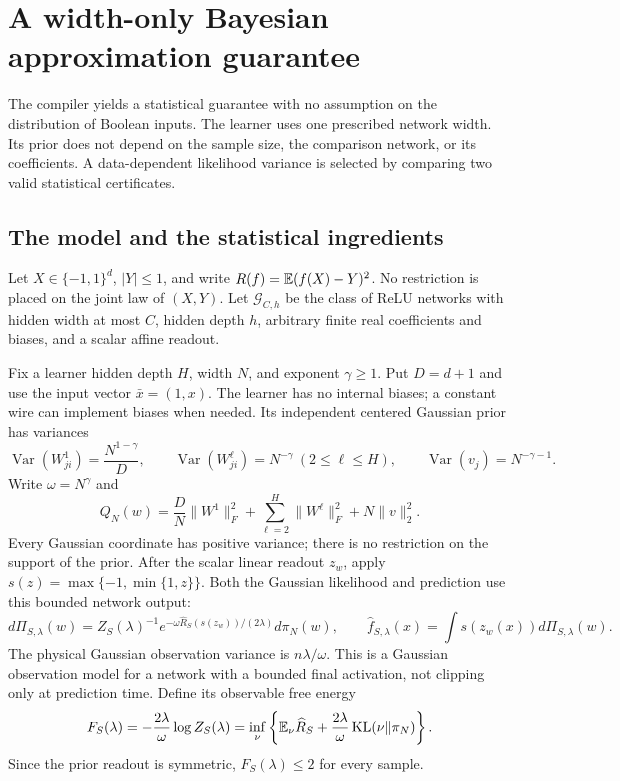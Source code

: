 \section{A width-only Bayesian approximation guarantee}
\label{sec:boolean-learning}
The compiler yields a statistical guarantee with no assumption on the distribution of Boolean inputs. The learner uses one prescribed network width. Its prior does not depend on the sample size, the comparison network, or its coefficients. A data-dependent likelihood variance is selected by comparing two valid statistical certificates.

\subsection{The model and the statistical ingredients}
Let $X\in\{-1,1\}^d$, $|Y|\le1$, and write
$R(f)=\mathbb E(f(X)-Y)^2$. No restriction is placed on the joint law of $(X,Y)$. Let $\mathcal G_{C,h}$ be the class of ReLU networks with hidden width at most $C$, hidden depth $h$, arbitrary finite real coefficients and biases, and a scalar affine readout.

Fix a learner hidden depth $H$, width $N$, and exponent $\gamma\ge1$. Put $D=d+1$ and use the input vector $\bar x=(1,x)$. The learner has no internal biases; a constant wire can implement biases when needed. Its independent centered Gaussian prior has variances
\begin{equation}
 \operatorname{Var}(W^1_{ji})=\frac{N^{1-\gamma}}D,
 \qquad \operatorname{Var}(W^\ell_{ji})=N^{-\gamma}\ (2\le\ell\le H),
 \qquad \operatorname{Var}(v_j)=N^{-\gamma-1}.
 \label{eq:boolean-Gaussian-prior}
\end{equation}
Write $\omega=N^\gamma$ and
\[
 Q_N(w)=\frac DN\|W^1\|_F^2+
              \sum_{\ell=2}^H\|W^\ell\|_F^2+N\|v\|_2^2.
\]
Every Gaussian coordinate has positive variance; there is no restriction on the support of the prior. After the scalar linear readout $z_w$, apply $s(z)=\max\{-1,\min\{1,z\}\}$. Both the Gaussian likelihood and prediction use this bounded network output:
\begin{equation}
 d\Pi_{S,\lambda}(w)=Z_S(\lambda)^{-1}
  e^{-\omega\widehat R_S(s(z_w))/(2\lambda)}d\pi_N(w),
 \qquad \widehat f_{S,\lambda}(x)=\int s(z_w(x))d\Pi_{S,\lambda}(w).
 \label{eq:boolean-posterior}
\end{equation}
The physical Gaussian observation variance is $n\lambda/\omega$. This is a Gaussian observation model for a network with a bounded final activation, not clipping only at prediction time. Define its observable free energy
\[
 F_S(\lambda)=-\frac{2\lambda}{\omega}\log Z_S(\lambda)
 =\inf_\nu\left\{\mathbb E_\nu\widehat R_S+
                  \frac{2\lambda}{\omega}\operatorname{KL}(\nu\Vert\pi_N)\right\}.
\]
Since the prior readout is symmetric, $F_S(\lambda)\le2$ for every sample.

